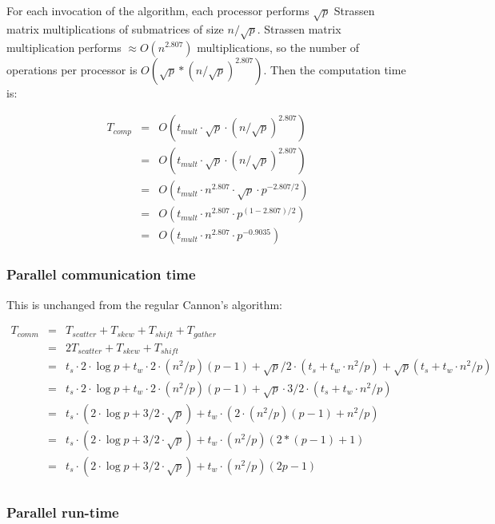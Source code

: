 \documentclass{article}
\begin{document}
For each invocation of the algorithm, each processor performs $\sqrt{p}$ Strassen
matrix multiplications of submatrices of size $n/\sqrt{p}$. Strassen matrix
multiplication performs $\approx O(n^{2.807})$ multiplications, so the number of
operations per processor is $O(\sqrt{p}*(n/\sqrt{p})^{2.807})$. Then the computation time is:

\begin{eqnarray*}
T_{{comp}} &=& O(t_{{mult}} \cdot \sqrt{p} \cdot (n/\sqrt{p})^{2.807}) \\
&=& O(t_{{mult}} \cdot \sqrt{p} \cdot (n/\sqrt{p})^{2.807}) \\
&=& O(t_{{mult}} \cdot n^{2.807} \cdot \sqrt{p} \cdot  p^{-2.807/2}) \\
&=& O(t_{{mult}} \cdot n^{2.807} \cdot  p^{(1-2.807)/2}) \\
&=& O(t_{{mult}} \cdot n^{2.807} \cdot  p^{-0.9035})
\end{eqnarray*}

\subsubsection{Parallel communication time}

This is unchanged from the regular Cannon's algorithm:

\begin{eqnarray*}
T_{{comm}} 	&=& T_{{scatter}} + T_{{skew}} + T_{{shift}} + T_{{gather}} \\
			&=& 2 T_{{scatter}} + T_{{skew}} + T_{{shift}} \\
			&=& t_s \cdot 2 \cdot \log{p} + t_w \cdot 2 \cdot (n^2/p)(p-1) + \sqrt{p}/2 \cdot (t_s + t_w \cdot n^2/p) + \sqrt{p}(t_s + t_w \cdot n^2/p) \\
			&=& t_s \cdot 2 \cdot \log{p} + t_w \cdot 2 \cdot (n^2/p)(p-1) + \sqrt{p} \cdot 3/2 \cdot (t_s + t_w \cdot n^2/p) \\
			&=& t_s \cdot (2 \cdot \log{p} + 3/2 \cdot \sqrt{p}) + t_w \cdot (2 \cdot (n^2/p)(p-1) + n^2/p) \\
			&=& t_s \cdot (2 \cdot \log{p} + 3/2 \cdot \sqrt{p}) + t_w \cdot (n^2/p)(2*(p-1) + 1) \\
			&=& t_s \cdot (2 \cdot \log{p} + 3/2 \cdot \sqrt{p}) + t_w \cdot (n^2/p)(2p-1) \\
\end{eqnarray*}

\subsubsection{Parallel run-time}
\end{document}

